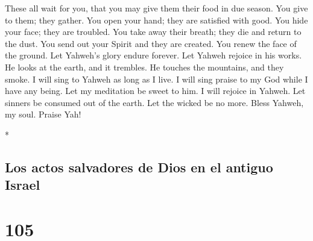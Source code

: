 \begin{paracol}{2}
\begin{otherlanguage}{english}
 These all wait for you, that you may give them their
food in due season.  You give to them; they gather. You
open your hand; they are satisfied with good.  You hide
your face; they are troubled. You take away their breath; they die and
return to the dust.  You send out your Spirit and they
are created. You renew the face of the ground.  Let
Yahweh's glory endure forever. Let Yahweh rejoice in his works.
 He looks at the earth, and it trembles. He touches the
mountains, and they smoke.  I will sing to Yahweh as long
as I live. I will sing praise to my God while I have any being.
 Let my meditation be sweet to him. I will rejoice in
Yahweh.  Let sinners be consumed out of the earth. Let
the wicked be no more. Bless Yahweh, my soul. Praise Yah!

\end{otherlanguage}

\switchcolumn[0]*

\hypertarget{los-actos-salvadores-de-dios-en-el-antiguo-israel}{%
\subsection{Los actos salvadores de Dios en el antiguo
Israel}\label{los-actos-salvadores-de-dios-en-el-antiguo-israel}}

\hypertarget{section-208}{%
\section{105}\label{section-208}}


\end{paracol}
